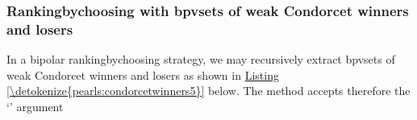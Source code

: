 \documentclass[a4paper,12pt,english]{sphinxhowto}
\begin{document}
\subsubsection{Ranking\sphinxhyphen{}by\sphinxhyphen{}choosing with bpv\sphinxhyphen{}sets of weak Condorcet winners and losers}
\label{\detokenize{pearls:ranking-by-choosing-with-bpv-sets-of-weak-condorcet-winners-and-losers}}
\sphinxAtStartPar
In a bipolar ranking\sphinxhyphen{}by\sphinxhyphen{}choosing strategy, we may recursively extract bpv\sphinxhyphen{}sets of weak Condorcet winners and losers as shown in \hyperref[\detokenize{pearls:condorcetwinners5}]{Listing \ref{\detokenize{pearls:condorcetwinners5}}} below. The  method accepts therefore the ‘’ argument
\def\sphinxLiteralBlockLabel{\label{\detokenize{pearls:condorcetwinners5}}}
%
\end{document}
